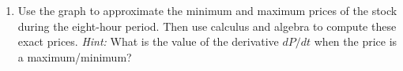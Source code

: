 \documentclass{ximera}
\begin{document}
\begin{question}
\begin{enumerate}




\item Use the graph to approximate the minimum and maximum prices of the stock during the eight-hour period. Then use calculus and algebra to compute these exact prices. \emph{Hint:} What is the value of the derivative $dP/dt$ when the price is a maximum/minimum?







\end{enumerate}
\end{question}
\end{document}
